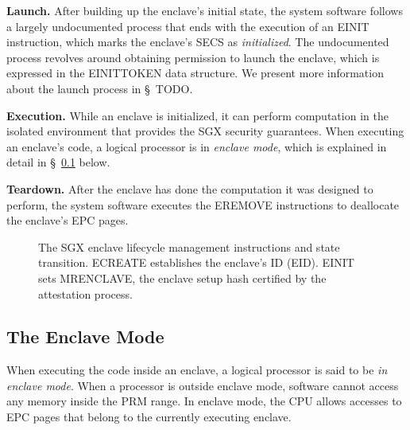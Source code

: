 \textbf{Launch.} After building up the enclave's initial state, the system
software follows a largely undocumented process that ends with the execution of
an EINIT instruction, which marks the enclave's SECS as \textit{initialized}.
The undocumented process revolves around obtaining permission to launch the
enclave, which is expressed in the EINITTOKEN data structure. We present more
information about the launch process in \S~TODO.

\textbf{Execution.} While an enclave is initialized, it can perform computation
in the isolated environment that provides the SGX security guarantees. When
executing an enclave's code, a logical processor is in \textit{enclave mode},
which is explained in detail in \S~\ref{sec:enclave_mode} below.

\textbf{Teardown.} After the enclave has done the computation it was designed
to perform, the system software executes the EREMOVE instructions to deallocate
the enclave's EPC pages.

\begin{figure}[hbt]
  \caption{
    The SGX enclave lifecycle management instructions and state transition.
    ECREATE establishes the enclave's ID (EID). EINIT sets MRENCLAVE, the
    enclave setup hash certified by the attestation process.
  }
  \label{fig:enclave_lifecycle}
\end{figure}


\subsection{The Enclave Mode}
\label{sec:enclave_mode}


When executing the code inside an enclave, a logical processor is said to be
\textit{in enclave mode}. When a processor is outside enclave mode, software
cannot access any memory inside the PRM range. In enclave mode, the CPU allows
accesses to EPC pages that belong to the currently executing enclave.

